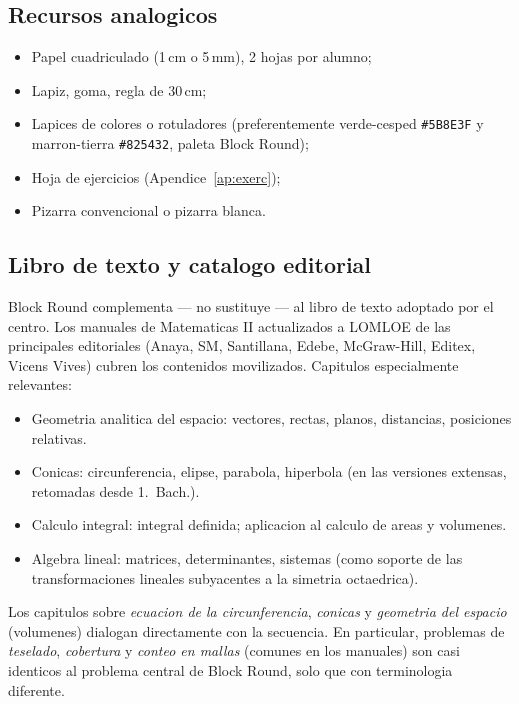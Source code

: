 \documentclass[12pt,a4paper]{scrartcl}
\begin{document}
\subsection{Recursos analogicos}
\begin{itemize}[leftmargin=1.3em,itemsep=0.15em,topsep=0.3em]
  \item Papel cuadriculado (1\,cm o 5\,mm), 2 hojas por alumno;
  \item Lapiz, goma, regla de 30\,cm;
  \item Lapices de colores o rotuladores (preferentemente verde-cesped \texttt{\#5B8E3F} y marron-tierra \texttt{\#825432}, paleta Block Round);
  \item Hoja de ejercicios (Apendice~\ref{ap:exerc});
  \item Pizarra convencional o pizarra blanca.
\end{itemize}

\subsection{Libro de texto y catalogo editorial}\label{sec:pnld}

Block Round complementa --- no sustituye --- al libro de texto adoptado por el centro. Los manuales de Matematicas II actualizados a LOMLOE de las principales editoriales (Anaya, SM, Santillana, Edebe, McGraw-Hill, Editex, Vicens Vives) cubren los contenidos movilizados. Capitulos especialmente relevantes:

\begin{itemize}[leftmargin=1.3em,itemsep=0.1em,topsep=0.2em,nosep]
  \item Geometria analitica del espacio: vectores, rectas, planos, distancias, posiciones relativas.
  \item Conicas: circunferencia, elipse, parabola, hiperbola (en las versiones extensas, retomadas desde 1.\textordmasculine\ Bach.).
  \item Calculo integral: integral definida; aplicacion al calculo de areas y volumenes.
  \item Algebra lineal: matrices, determinantes, sistemas (como soporte de las transformaciones lineales subyacentes a la simetria octaedrica).
\end{itemize}

Los capitulos sobre \emph{ecuacion de la circunferencia}, \emph{conicas} y \emph{geometria del espacio} (volumenes) dialogan directamente con la secuencia. En particular, problemas de \emph{teselado}, \emph{cobertura} y \emph{conteo en mallas} (comunes en los manuales) son casi identicos al problema central de Block Round, solo que con terminologia diferente.
\end{document}
